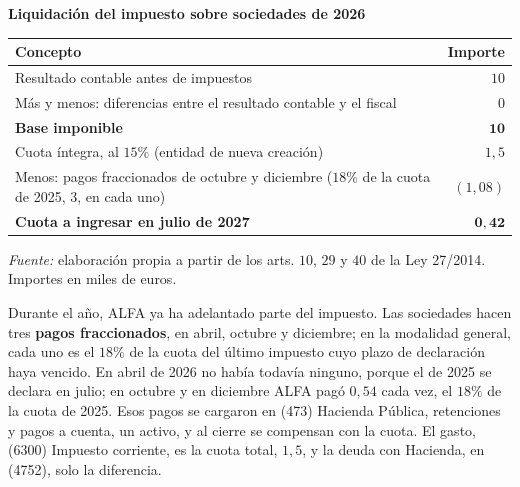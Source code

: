 \documentclass[10pt,a4paper]{article}
\begin{document}
\begin{center}\begin{minipage}{\linewidth}\centering
{\small\textbf{Liquidación del impuesto sobre sociedades de 2026}}\par\vspace{0.3em}
{\small
\begin{tabular}{p{10cm} r}
\hline
\textbf{Concepto} & \textbf{Importe} \\
\hline
Resultado contable antes de impuestos & $10$ \\
Más y menos: diferencias entre el resultado contable y el fiscal & $0$ \\
\textbf{Base imponible} & $\mathbf{10}$ \\
Cuota íntegra, al $15\%$ (entidad de nueva creación) & $1,5$ \\
Menos: pagos fraccionados de octubre y diciembre ($18\%$ de la cuota de 2025, $3$, en cada uno) & $(1,08)$ \\
\textbf{Cuota a ingresar en julio de 2027} & $\mathbf{0,42}$ \\
\hline
\end{tabular}}\par\vspace{0.3em}
{\small\textit{Fuente: }elaboración propia a partir de los arts. $10$, $29$ y $40$ de la Ley 27/2014. Importes en miles de euros.}
\end{minipage}\end{center}

Durante el año, ALFA ya ha adelantado parte del impuesto. Las sociedades hacen tres \textbf{pagos fraccionados}, en abril, octubre y diciembre; en la modalidad general, cada uno es el $18\%$ de la cuota del último impuesto cuyo plazo de declaración haya vencido. En abril de 2026 no había todavía ninguno, porque el de 2025 se declara en julio; en octubre y en diciembre ALFA pagó $0,54$ cada vez, el $18\%$ de la cuota de 2025. Esos pagos se cargaron en (473) Hacienda Pública, retenciones y pagos a cuenta, un activo, y al cierre se compensan con la cuota. El gasto, (6300) Impuesto corriente, es la cuota total, $1,5$, y la deuda con Hacienda, en (4752), solo la diferencia.
\end{document}
